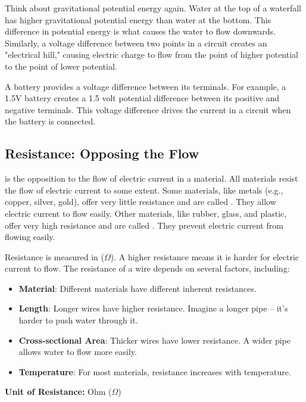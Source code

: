 Think about gravitational potential energy again.  Water at the top of a waterfall has higher gravitational potential energy than water at the bottom.  This difference in potential energy is what causes the water to flow downwards.  Similarly, a voltage difference between two points in a circuit creates an "electrical hill," causing electric charge to flow from the point of higher potential to the point of lower potential.

A battery provides a voltage difference between its terminals.  For example, a 1.5V battery creates a 1.5 volt potential difference between its positive and negative terminals.  This voltage difference drives the current in a circuit when the battery is connected.

\subsection{Resistance: Opposing the Flow}

 is the opposition to the flow of electric current in a material.  All materials resist the flow of electric current to some extent.  Some materials, like metals (e.g., copper, silver, gold), offer very little resistance and are called .  They allow electric current to flow easily.  Other materials, like rubber, glass, and plastic, offer very high resistance and are called .  They prevent electric current from flowing easily.

Resistance is measured in  ($\Omega$).  A higher resistance means it is harder for electric current to flow.  The resistance of a wire depends on several factors, including:

\begin{itemize}
    \item \textbf{Material}: Different materials have different inherent resistances.
    \item \textbf{Length}: Longer wires have higher resistance. Imagine a longer pipe – it's harder to push water through it.
    \item \textbf{Cross-sectional Area}: Thicker wires have lower resistance. A wider pipe allows water to flow more easily.
    \item \textbf{Temperature}: For most materials, resistance increases with temperature.
\end{itemize}

\begin{marginnote}
\textbf{Unit of Resistance:}
Ohm ($\Omega$)
\end{marginnote}

